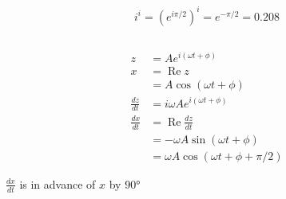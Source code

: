 \documentclass{article}
\renewcommand{\Re}{\operatorname{Re}}
\begin{document}
\subsection{}

\[i^i = (e^{i \pi / 2})^i = e^{-\pi / 2} = 0.208\]

\subsection{}

\begin{align*}
  z               & = A e^{i (\omega t + \phi)}                 \\
  x               & = \Re z                                     \\
                  & = A \cos (\omega t + \phi)                  \\
  \frac{d z}{d t} & = i \omega A e^{i (\omega t + \phi)}        \\
  \frac{d x}{ dt} & = \Re \frac{d z}{d t}                       \\
                  & = -\omega A \sin (\omega t + \phi)          \\
                  & = \omega A \cos (\omega t + \phi + \pi / 2)
\end{align*}

$\frac{d x}{d t}$ is in advance of $x$ by $\ang{90}$

\subsection{}
\end{document}
